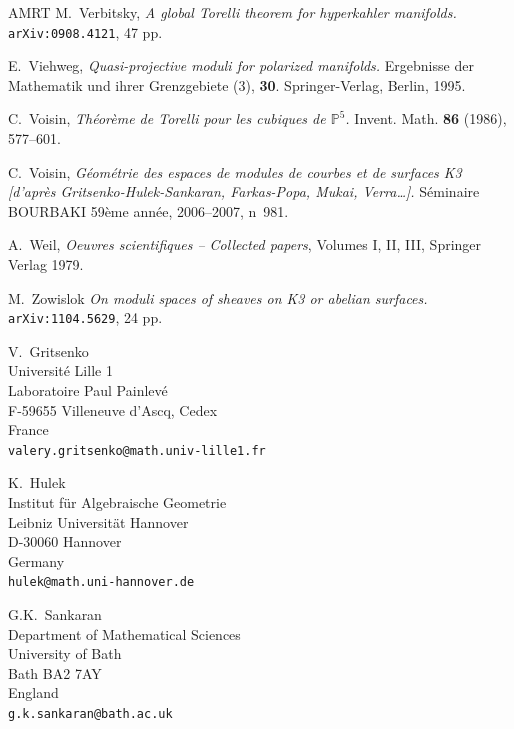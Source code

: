 \documentclass[a4paper,11pt]{article}
\newcommand{\PP}{\mathbb P}
\begin{document}
\begin{thebibliography}{AMRT}
 M.~Verbitsky, {\it A global Torelli theorem for
  hyperkahler manifolds.}  {\tt arXiv:0908.4121}, 47 pp.

 E.~Viehweg, {\it Quasi-projective moduli for
  polarized manifolds.} Er\-geb\-nisse der Mathematik und ihrer
  Grenzgebiete (3), {\bf 30}. Springer-Verlag, Berlin, 1995.

 C.~Voisin, {\it Th\'eor\`eme de Torelli pour les
  cubiques de $\PP^5$.}  Invent. Math.  {\bf 86} (1986), 577--601.

 C.~Voisin, {\it G\'eom\'etrie des espaces de
  modules de courbes et de surfaces K3 [d'apr\`es
    Gri\-tsen\-ko-Hu\-lek-San\-ka\-ran, Farkas\--Popa, Mukai,
    Verra\dots].} S\'eminaire BOURBAKI 59\`eme ann\'ee, 2006--2007,
  n~981.

 A.~Weil, {\it Oeuvres scientifiques -- Collected
  papers}, Volumes I, II, III, Springer Verlag 1979.

 M.~Zowislok {\it On moduli spaces of sheaves on K3 or
  abelian surfaces.} {\tt arXiv:1104.5629}, 24 pp.
\end{thebibliography}

\bigskip
\noindent
V.~Gritsenko\\
Universit\'e Lille 1\\
Laboratoire Paul Painlev\'e\\
F-59655 Villeneuve d'Ascq, Cedex\\
France\\
{\tt valery.gritsenko@math.univ-lille1.fr}
\bigskip

\noindent
K.~Hulek\\
Institut f\"ur Algebraische Geometrie\\
Leibniz Universit\"at Hannover\\
D-30060 Hannover\\
Germany\\
{\tt hulek@math.uni-hannover.de}
\bigskip

\noindent
G.K.~Sankaran\\
Department of Mathematical Sciences\\
University of Bath\\
Bath BA2 7AY\\
England\\
{\tt g.k.sankaran@bath.ac.uk}
\end{document}
